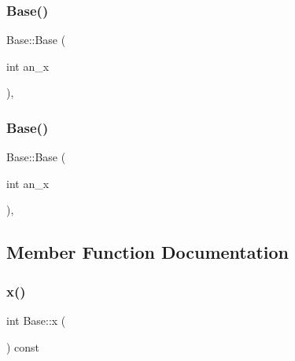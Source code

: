 \mbox{\label{class_base_a1d5f3fb92f8cbc687705785bdc6abd18}} 
\subsubsection{\texorpdfstring{Base()}{Base()}\hspace{0.1cm}{\footnotesize\ttfamily [2/3]}}
{\footnotesize\ttfamily Base\+::\+Base (\begin{DoxyParamCaption}\item[{int}]{an\+\_\+x }\end{DoxyParamCaption})\hspace{0.3cm}{\ttfamily [inline]}, {\ttfamily [explicit]}}

\mbox{\label{class_base_a1d5f3fb92f8cbc687705785bdc6abd18}} 
\subsubsection{\texorpdfstring{Base()}{Base()}\hspace{0.1cm}{\footnotesize\ttfamily [3/3]}}
{\footnotesize\ttfamily Base\+::\+Base (\begin{DoxyParamCaption}\item[{int}]{an\+\_\+x }\end{DoxyParamCaption})\hspace{0.3cm}{\ttfamily [inline]}, {\ttfamily [explicit]}}



\subsection{Member Function Documentation}
\mbox{\label{class_base_a779fd2b157ebd763b15383d96047e07c}} 
\subsubsection{\texorpdfstring{x()}{x()}\hspace{0.1cm}{\footnotesize\ttfamily [1/3]}}
{\footnotesize\ttfamily int Base\+::x (\begin{DoxyParamCaption}{ }\end{DoxyParamCaption}) const\hspace{0.3cm}{\ttfamily [inline]}}

